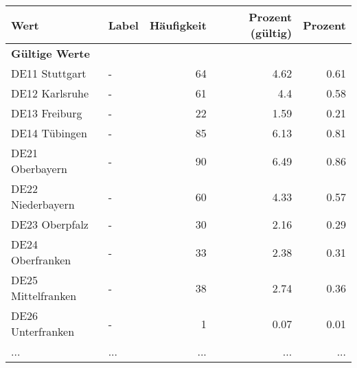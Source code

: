      \begin{longtable}{Xlrrr}
     \toprule
     \textbf{Wert} & \textbf{Label} & \textbf{Häufigkeit} & \textbf{Prozent (gültig)} & \textbf{Prozent} \\
     \endhead
     \midrule
     \multicolumn{5}{l}{\textbf{Gültige Werte}}\\
        \multicolumn{1}{X}{DE11 Stuttgart} & - & \num{64} & \num[round-mode=places,round-precision=2]{4.62} & \num[round-mode=places,round-precision=2]{0.61} \\
        \multicolumn{1}{X}{DE12 Karlsruhe} & - & \num{61} & \num[round-mode=places,round-precision=2]{4.4} & \num[round-mode=places,round-precision=2]{0.58} \\
        \multicolumn{1}{X}{DE13 Freiburg} & - & \num{22} & \num[round-mode=places,round-precision=2]{1.59} & \num[round-mode=places,round-precision=2]{0.21} \\
        \multicolumn{1}{X}{DE14 Tübingen} & - & \num{85} & \num[round-mode=places,round-precision=2]{6.13} & \num[round-mode=places,round-precision=2]{0.81} \\
        \multicolumn{1}{X}{DE21 Oberbayern} & - & \num{90} & \num[round-mode=places,round-precision=2]{6.49} & \num[round-mode=places,round-precision=2]{0.86} \\
        \multicolumn{1}{X}{DE22 Niederbayern} & - & \num{60} & \num[round-mode=places,round-precision=2]{4.33} & \num[round-mode=places,round-precision=2]{0.57} \\
        \multicolumn{1}{X}{DE23 Oberpfalz} & - & \num{30} & \num[round-mode=places,round-precision=2]{2.16} & \num[round-mode=places,round-precision=2]{0.29} \\
        \multicolumn{1}{X}{DE24 Oberfranken} & - & \num{33} & \num[round-mode=places,round-precision=2]{2.38} & \num[round-mode=places,round-precision=2]{0.31} \\
        \multicolumn{1}{X}{DE25 Mittelfranken} & - & \num{38} & \num[round-mode=places,round-precision=2]{2.74} & \num[round-mode=places,round-precision=2]{0.36} \\
        \multicolumn{1}{X}{DE26 Unterfranken} & - & \num{1} & \num[round-mode=places,round-precision=2]{0.07} & \num[round-mode=places,round-precision=2]{0.01} \\
       ... & ... & ... & ... & ... \\

\end{longtable}
